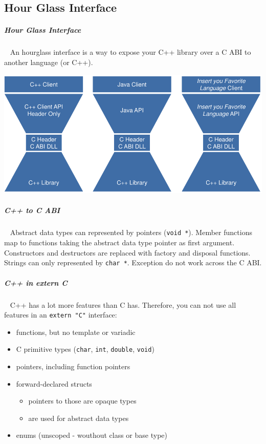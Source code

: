 \documentclass[11pt,twoside,landscape]{article}
\begin{document}
\begin{multicols}{2}
\section{Hour Glass Interface}
\label{sec:orgceb7ada}
\subparagraph{Hour Glass Interface} \
\label{sec:orgec13a35}
An hourglass interface is a way to expose your C++ library over a C ABI to another language (or C++).


{
\begin{center}
\includegraphics[width=.9\linewidth]{img/hourglass_interface.png}
\end{center}
\label{fig:hourglass-interface-idea}
}
\subparagraph{C++ to C ABI} \
\label{sec:org8561bc0}
Abstract data types can represented by pointers (\texttt{void *}).
Member functions map to functions taking the abstract data type pointer as first argument.
Constructors and destructors are replaced with factory and disposal functions.
Strings can only represented by \texttt{char *}.
Exception do not work across the C ABI.

\subparagraph{C++ in extern C} \
\label{sec:orgc900ea4}
C++ has a lot more features than C has.
Therefore, you can not use all features in an \texttt{extern "C"} interface:

\begin{itemize}
\item functions, but no template or variadic
\item C primitive types (\texttt{char}, \texttt{int}, \texttt{double}, \texttt{void})
\item pointers, including function pointers
\item forward-declared structs
\begin{itemize}
\item pointers to those are opaque types
\item are used for abstract data types
\end{itemize}
\item enums (unscoped - wouthout class or base type)
\end{itemize}



\end{multicols}
\end{document}

